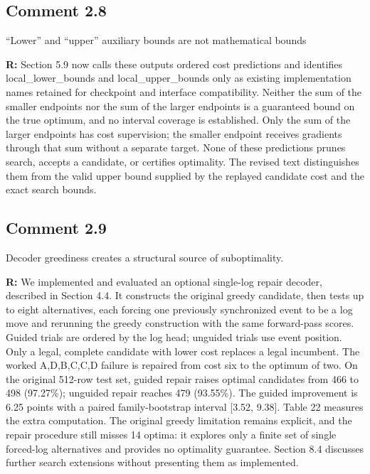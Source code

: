 \documentclass[11pt,a4paper]{article}
\newenvironment{reviewercomment}{%
  \begin{list}{}{\setlength{\leftmargin}{1.5em}%
    \setlength{\rightmargin}{0pt}\setlength{\topsep}{0.5em}}%
  \item\relax\color{reviewerred}\ignorespaces
}{\end{list}}
\begin{document}
\subsection*{Comment 2.8}

\begin{reviewercomment}“Lower” and “upper” auxiliary bounds are not mathematical bounds\end{reviewercomment}

{\color{black}\textbf{R:} Section 5.9 now calls these outputs ordered cost predictions and identifies local\_lower\_bounds and local\_upper\_bounds only as existing implementation names retained for checkpoint and interface compatibility. Neither the sum of the smaller endpoints nor the sum of the larger endpoints is a guaranteed bound on the true optimum, and no interval coverage is established. Only the sum of the larger endpoints has cost supervision; the smaller endpoint receives gradients through that sum without a separate target. None of these predictions prunes search, accepts a candidate, or certifies optimality. The revised text distinguishes them from the valid upper bound supplied by the replayed candidate cost and the exact search bounds.\par}

\subsection*{Comment 2.9}

\begin{reviewercomment}Decoder greediness creates a structural source of suboptimality.\end{reviewercomment}

{\color{black}\textbf{R:} We implemented and evaluated an optional single-log repair decoder, described in Section 4.4. It constructs the original greedy candidate, then tests up to eight alternatives, each forcing one previously synchronized event to be a log move and rerunning the greedy construction with the same forward-pass scores. Guided trials are ordered by the log head; unguided trials use event position. Only a legal, complete candidate with lower cost replaces a legal incumbent. The worked A,D,B,C,C,D failure is repaired from cost six to the optimum of two. On the original 512-row test set, guided repair raises optimal candidates from 466 to 498 (97.27\%); unguided repair reaches 479 (93.55\%). The guided improvement is 6.25 points with a paired family-bootstrap interval [3.52, 9.38]. Table 22 measures the extra computation. The original greedy limitation remains explicit, and the repair procedure still misses 14 optima: it explores only a finite set of single forced-log alternatives and provides no optimality guarantee. Section 8.4 discusses further search extensions without presenting them as implemented.\par}
\end{document}
